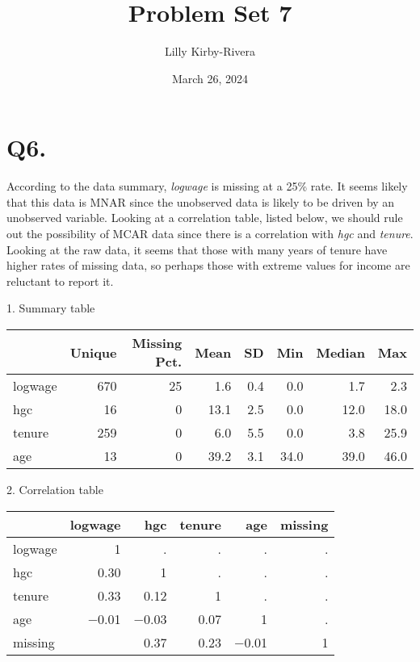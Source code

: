 \documentclass{article}
\title{Problem Set 7}
\author{Lilly Kirby-Rivera}
\date{March 26, 2024}
\begin{document}
\maketitle

\section*{Q6.}
According to the data summary, \textit{logwage} is missing at a 25\% rate. It seems likely that this data is MNAR since the unobserved data is likely to be driven by an unobserved variable. Looking at a correlation table, listed below, we should rule out the possibility of MCAR data since there is a correlation with \textit{hgc} and \textit{tenure}. Looking at the raw data, it seems that those with many years of tenure have higher rates of missing data, so perhaps those with extreme values for income are reluctant to report it.


\begin{center}
1. Summary table \\
\begin{tabular}[t]{lrrrrrrr}
\toprule
  & Unique & Missing Pct. & Mean & SD & Min & Median & Max\\
\midrule
logwage & 670 & 25 & \num{1.6} & \num{0.4} & \num{0.0} & \num{1.7} & \num{2.3}\\
hgc & 16 & 0 & \num{13.1} & \num{2.5} & \num{0.0} & \num{12.0} & \num{18.0}\\
tenure & 259 & 0 & \num{6.0} & \num{5.5} & \num{0.0} & \num{3.8} & \num{25.9}\\
age & 13 & 0 & \num{39.2} & \num{3.1} & \num{34.0} & \num{39.0} & \num{46.0}\\
\bottomrule
\end{tabular}

\vskip10pt
2. Correlation table \\
\begin{tabular}[t]{lrrrrr}
\toprule
  & logwage & hgc & tenure & age & missing\\
\midrule
logwage & 1 & . & . & . & .\\
hgc & \num{.30} & 1 & . & . & .\\
tenure & \num{.33} & \num{.12} & 1 & . & .\\
age & \num{-.01} & \num{-.03} & \num{.07} & 1 & .\\
missing &  & \num{.37} & \num{.23} & \num{-.01} & 1\\
\bottomrule
\end{tabular}
\end{center}
\end{document}
